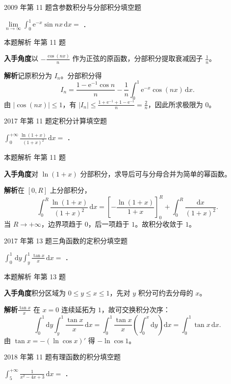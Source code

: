 \documentclass[UTF8,zihao=-4,fontset=fandol]{ctexart}
\renewcommand{\lim}{\operatorname*{lim}\limits}
\newcommand{\blank}{\underline{\hspace{5em}}}
\newcommand{\QuestionPage}[6]{%
  \par\noindent\begin{minipage}{\linewidth}
  \raggedright
  {\small\textcolor{black!60}{#3\quad #5}\hfill\textcolor{accent}{#2}}\par\smallskip}
\newcommand{\QuestionEnd}{\end{minipage}\par\medskip}
\newcommand{\QuestionPage}[6]{%
  \clearpage
  {\small\textcolor{accent}{#1\hfill #2}}\par\medskip
  {\small\textcolor{black!60}{#3\quad #5\hfill #6}}\par\vspace{9bp}}
\newcommand{\QuestionEnd}{}
\newenvironment{QuestionSolution}[1]{%
  \clearpage
  {\small\textcolor{black!60}{本题解析\quad #1}}\par\medskip
}{\par\clearpage}
\begin{document}
\QuestionPage{3.3 两种基本积分法}{填空题}{2009 年第 11 题}{2}{含参数积分与分部积分}{154 / 234}
$\lim_{n \to \infty} \int_{0}^{1} \mathrm{e}^{- x}\sin nx\,\mathrm{d} x =$ \blank{}．
\QuestionEnd

\begin{QuestionSolution}{2009 年第 11 题}
\textbf{入手角度}\quad 以 \(-\frac{\cos(nx)}{n}\) 作为正弦的原函数，分部积分提取衰减因子 \(\frac{1}{n}\)。

\textbf{解析}\quad 记原积分为 \(I_n\)。分部积分得
\[
I_n=\frac{1-\mathrm{e}^{-1}\cos n}{n}
-\frac1n\int_0^1 \mathrm{e}^{-x}\cos(nx)\,\mathrm{d}x.
\]
由 \(|\cos(nx)|\le1\)，有 \(|I_n|\le\frac{1+\mathrm{e}^{-1}+1-\mathrm{e}^{-1}}{n}=\frac{2}{n}\)，因此所求极限为 \(\boxed{0}\)。
\end{QuestionSolution}

\QuestionPage{3.3 两种基本积分法}{填空题}{2017 年第 11 题}{2}{定积分计算}{155 / 234}
$\int_0^{+\infty} \frac{\ln(1 + x)}{(1 + x)^2}\,\mathrm{d} x =$ \blank{}．
\QuestionEnd

\begin{QuestionSolution}{2017 年第 11 题}
\textbf{入手角度}\quad 对 \(\ln(1+x)\) 分部积分，求导后可与分母合并为简单的幂函数。

\textbf{解析}\quad 在 \([0,R]\) 上分部积分，
\[
\int_0^R\frac{\ln(1+x)}{(1+x)^2}\,\mathrm{d}x
=\left[-\frac{\ln(1+x)}{1+x}\right]_0^R
+\int_0^R\frac{\mathrm{d}x}{(1+x)^2}.
\]
当 \(R\to+\infty\)，边界项趋于 \(0\)，后一项趋于 \(1\)。故积分收敛于 \(\boxed{1}\)。
\end{QuestionSolution}

\QuestionPage{3.3 两种基本积分法}{填空题}{2017 年第 13 题}{2}{三角函数的定积分}{156 / 234}
$\int_0^1 \,\mathrm{d} y \int_y^1 \frac{\tan x}{x}\,\mathrm{d} x =$ \blank{}．
\QuestionEnd

\begin{QuestionSolution}{2017 年第 13 题}
\textbf{入手角度}\quad 积分区域为 \(0\le y\le x\le1\)，先对 \(y\) 积分可约去分母的 \(x\)。

\textbf{解析}\quad \(\frac{\tan x}{x}\) 在 \(x=0\) 连续延拓为 \(1\)，故可交换积分次序：
\[
\int_0^1\mathrm{d}y\int_y^1\frac{\tan x}{x}\,\mathrm{d}x
=\int_0^1\frac{\tan x}{x}\left(\int_0^x\mathrm{d}y\right)\mathrm{d}x
=\int_0^1\tan x\,\mathrm{d}x.
\]
由 \(\tan x=-(\ln\cos x)'\) 得 \(\boxed{-\ln\cos1}\)。
\end{QuestionSolution}

\QuestionPage{3.3 两种基本积分法}{填空题}{2018 年第 11 题}{2}{有理函数的积分}{157 / 234}
$\int_5^{+\infty} \frac{1}{x^2 - 4x + 3}\,\mathrm{d} x =$ \blank{}．
\QuestionEnd
\end{document}
